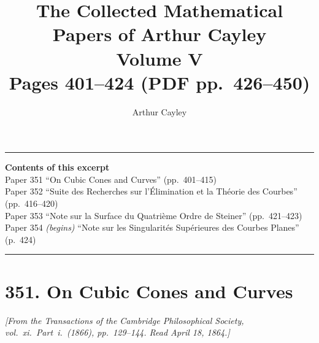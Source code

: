 \documentclass[11pt,a4paper]{article}
\title{\textbf{The Collected Mathematical Papers of Arthur Cayley}\\[6pt]
\Large Volume V\\[12pt]
\large Pages 401--424 \;(PDF pp.\ 426--450)}
\author{Arthur Cayley}
\date{}
\begin{document}
\maketitle
\thispagestyle{empty}

\vspace{1em}
\noindent\rule{\textwidth}{0.4pt}
\vspace{1em}

\begin{center}
\textbf{Contents of this excerpt}\\[4pt]
Paper 351 \quad ``On Cubic Cones and Curves'' \quad (pp.~401--415)\\[2pt]
Paper 352 \quad ``Suite des Recherches sur l'\'Elimination et la Th\'eorie des Courbes'' \quad (pp.~416--420)\\[2pt]
Paper 353 \quad ``Note sur la Surface du Quatri\`eme Ordre de Steiner'' \quad (pp.~421--423)\\[2pt]
Paper 354 \quad \textit{(begins)} ``Note sur les Singularit\'es Sup\'erieures des Courbes Planes'' \quad (p.~424)
\end{center}

\noindent\rule{\textwidth}{0.4pt}
\vspace{1em}

\section*{351. On Cubic Cones and Curves}

\noindent\textit{[From the \textit{Transactions of the Cambridge Philosophical Society}, vol.~xi.\ Part~i.\ (1866), pp.~129--144. Read April 18, 1864.]}

\medskip
\end{document}
